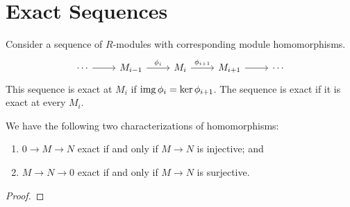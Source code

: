 \section{Exact Sequences}

\begin{definition}
    Consider a sequence of \(R\)-modules with corresponding module homomorphisms.
    \begin{equation*}
        \begin{tikzcd}
            \cdots \arrow{r} & M_{i-1} \arrow{r}{\phi_i} &
            M_i \arrow{r}{\phi_{i+1}} & M_{i+1} \arrow{r} & \cdots
        \end{tikzcd}
    \end{equation*}
    This sequence is exact at \(M_i\) if \(\operatorname{img}\phi_i = \ker\phi_{i+1}\).
    The sequence is exact if it is exact at every \(M_i\).
\end{definition}

\begin{proposition}
    We have the following two characterizations of homomorphisms:
    \begin{enumerate}[label={(\alph*)}, itemsep=0mm]
        \item \(0 \to M \to N\) exact if and only if \(M \to N\) is injective; and
        \item \(M \to N \to 0\) exact if and only if \(M \to N\) is surjective.
    \end{enumerate}
\end{proposition}
\begin{proof}
    
\end{proof}

